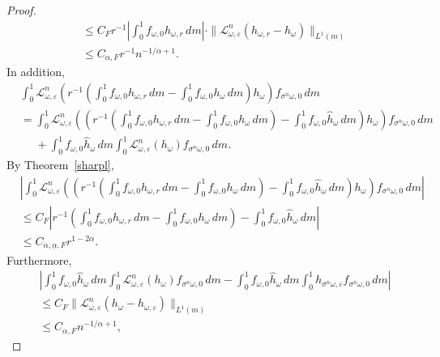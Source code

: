 \documentclass[10pt,a4paper]{amsart}
\begin{document}
\begin{proof}
\begin{equation}
\begin{split}
			&\le C_F r^{-1}\left |\int_0^1 f_{\omega, 0}h_{\omega, r}\, dm\right | \cdot \|\mathcal L_{\omega, \varepsilon}^n (h_{\omega, r}-h_\omega)\|_{L^1(m)} \\
			&\le C_{\alpha, F}  r^{-1}n^{-1/\alpha+1}.
		\end{split}
	\end{equation}
	In addition, 
	\[
	\begin{split}
		&\int_0^1 \mathcal L_{\omega, \varepsilon}^n \left (r^{-1}\left (\int_0^1 f_{\omega, 0}h_{\omega, r}\, dm-\int_0^1f_{\omega, 0}h_\omega \, dm\right )h_\omega \right )f_{\sigma^n \omega, 0}\, dm \\
		&=\int_0^1 \mathcal L_{\omega, \varepsilon}^n \left ( \left (r^{-1}\left (\int_0^1 f_{\omega, 0}h_{\omega, r}\, dm-\int_0^1f_{\omega, 0}h_\omega \, dm\right )-\int_0^1f_{\omega, 0}\hat h_\omega \, dm\right )h_\omega \right )f_{\sigma^n \omega, 0}\, dm \\
		&\phantom{=}+\int_0^1 f_{\omega, 0}\hat h_\omega \, dm \int_0^1 \mathcal L_{\omega, \varepsilon}^n (h_\omega) f_{\sigma^n \omega, 0}\, dm.
	\end{split}
	\]
	By Theorem~\ref{sharpl},\begin{equation}\label{gh5}
		\begin{split}
			& \left |\int_0^1 \mathcal L_{\omega, \varepsilon}^n \left ( \left (r^{-1}\left (\int_0^1 f_{\omega, 0}h_{\omega, r}\, dm-\int_0^1f_{\omega, 0}h_\omega \, dm\right )-\int_0^1f_{\omega, 0}\hat h_\omega \, dm\right )h_\omega \right )f_{\sigma^n \omega, 0}\, dm\right | \\
			&\le C_F \left |r^{-1}\left (\int_0^1 f_{\omega, 0}h_{\omega, r}\, dm-\int_0^1f_{\omega, 0}h_\omega \, dm\right )-\int_0^1f_{\omega, 0}\hat h_\omega \, dm\right |  \\
			&\le C_{\alpha, \underline{\alpha}, F} r^{1-2\alpha}.
		\end{split}
	\end{equation}
	Furthermore, 
	\begin{equation}\label{gh6}
		\begin{split}
			& \left |\int_0^1 f_{\omega, 0}\hat h_\omega \, dm \int_0^1 \mathcal L_{\omega, \varepsilon}^n (h_\omega) f_{\sigma^n \omega, 0}\, dm-\int_0^1 f_{\omega, 0}\hat h_\omega \, dm \int_0^1 h_{\sigma^n \omega, \varepsilon} f_{\sigma^n \omega, 0}\, dm \right | \\
			&\le C_F \|\mathcal L_{\omega, \varepsilon}^n (h_\omega-h_{\omega, \varepsilon})\|_{L^1(m)} \\
			&\le C_{\alpha, F} n^{-1/\alpha+1}, 

\end{split}
\end{equation}
\end{proof}
\end{document}
